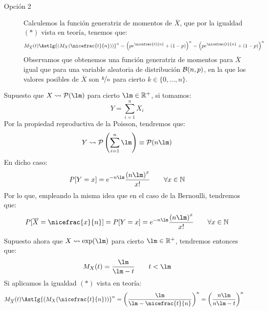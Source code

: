 \begin{ejercicio}
\begin{description}
\begin{description}
            \item[Opción 2] Calculemos la función generatriz de momentos de $\overline{X}$, que por la igualdad $(\ast)$ vista en teoría, tenemos que:
            \begin{align*}
                M_{\overline{X}}(t) &\AstIg {(M_X(\nicefrac{t}{n}))}^{n} = {\left(p e^{\nicefrac{t}{n}} + (1-p)\right)}^{n} = {\left(p e^{\nicefrac{t}{n}} + (1-p)\right)}^{n}
            \end{align*}
            Observamos que obtenemos una función generatriz de momentos para $\overline{X}$ igual que para una variable aleatoria de distribución $\mathcal{B}(n,p)$, en la que los valores posibles de $\overline{X}$ son $\nicefrac{k}{n}$ para cierto $k\in \{0,\ldots,n\}$.
        \end{description}
        \item [Poisson.] Supuesto que $X\rightsquigarrow \cc{P}(\lm)$ para cierto $\lm\in \mathbb{R}^+$, si tomamos:
            \begin{equation*}
                Y = \sum_{i=1}^{n}X_i
            \end{equation*}
            Por la propiedad reproductiva de la Poisson, tendremos que:
            \begin{equation*}
                Y\rightsquigarrow\cc{P}\left(\sum_{i=1}^{n}\lm\right) \equiv \cc{P}(n\lm)
            \end{equation*}
            En dicho caso:
            \begin{equation*}
                P[Y=x] = e^{-n\lm} \dfrac{{(n\lm)}^{x}}{x!} \qquad \forall x\in \mathbb{N}
            \end{equation*}
            Por lo que, empleando la misma idea que en el caso de la Bernoulli, tendremos que:
            \begin{equation*}
                P[\overline{X}=\nicefrac{x}{n}] = P[Y=x] = e^{-n\lm} \dfrac{{(n\lm)}^{x}}{x!} \qquad \forall x\in \mathbb{N}
            \end{equation*}
        \item [Exponencial.] Supuesto ahora que $X\rightsquigarrow \exp(\lm)$ para cierto $\lm\in \mathbb{R}^+$, tendremos entonces que:
            \begin{equation*}
                M_X(t) = \dfrac{\lm}{\lm - t} \qquad t<\lm
            \end{equation*}
            Si aplicamos la igualdad $(\ast)$ vista en teoría:
            \begin{align*}
                M_{\overline{X}}(t) &\AstIg {(M_X(\nicefrac{t}{n}))}^{n} = {\left(\dfrac{\lm}{\lm - \nicefrac{t}{n}}\right)}^{n} = {\left(\dfrac{n\lm}{n\lm - t}\right)}^{n}

\end{align*}
\end{description}
\end{ejercicio}
